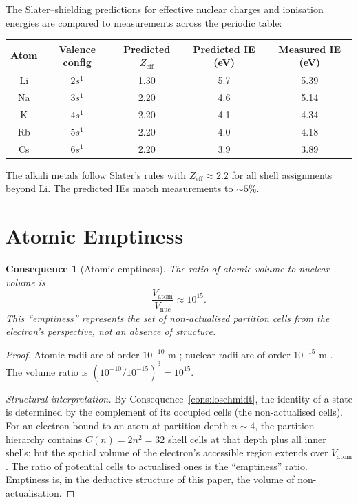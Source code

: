 \documentclass[11pt,twocolumn,a4paper]{article}
\theoremstyle{axiomstyle}
\theoremstyle{conseqstyle}
\newtheorem{consequence}{Consequence}
\theoremstyle{definition}
\theoremstyle{remark}
\begin{document}
The Slater--shielding predictions for effective nuclear charges and ionisation energies are compared to measurements across the periodic table:
\begin{center}
\begin{tabular}{c|c|c|c|c}
\toprule
Atom & Valence config & Predicted $Z_{\text{eff}}$ & Predicted IE (eV) & Measured IE (eV)\\
\midrule
Li & $2s^{1}$ & 1.30 & 5.7 & 5.39 \\
Na & $3s^{1}$ & 2.20 & 4.6 & 5.14 \\
K  & $4s^{1}$ & 2.20 & 4.1 & 4.34 \\
Rb & $5s^{1}$ & 2.20 & 4.0 & 4.18 \\
Cs & $6s^{1}$ & 2.20 & 3.9 & 3.89 \\
\bottomrule
\end{tabular}
\end{center}
The alkali metals follow Slater's rules with $Z_{\text{eff}}\approx 2.2$ for all shell assignments beyond Li. The predicted IEs match measurements to $\sim 5\%$.

\section{Atomic Emptiness}
\label{sec:atomicemptiness}

\begin{consequence}[Atomic emptiness]
\label{cons:atomicemptiness}
The ratio of atomic volume to nuclear volume is
\begin{equation}
\frac{V_{\text{atom}}}{V_{\text{nuc}}}\approx 10^{15}.
\label{eq:emptiness}
\end{equation}
This ``emptiness'' represents the set of non-actualised partition cells from the electron's perspective, not an absence of structure.
\end{consequence}

\begin{proof}
Atomic radii are of order $10^{-10}$ m \citep{nistasd}; nuclear radii are of order $10^{-15}$ m \citep{hofstadter1956}. The volume ratio is $(10^{-10}/10^{-15})^{3}=10^{15}$.

\emph{Structural interpretation.} By Consequence~\ref{cons:loschmidt}, the identity of a state is determined by the complement of its occupied cells (the non-actualised cells). For an electron bound to an atom at partition depth $n\sim 4$, the partition hierarchy contains $C(n)=2n^{2}=32$ shell cells at that depth plus all inner shells; but the spatial volume of the electron's accessible region extends over $V_{\text{atom}}$. The ratio of potential cells to actualised ones is the ``emptiness'' ratio. Emptiness is, in the deductive structure of this paper, the volume of non-actualisation.
\end{proof}
\end{document}
